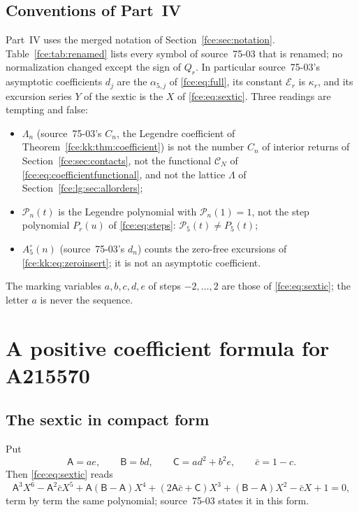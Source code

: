 \documentclass[11pt,a4paper]{article}
\numberwithin{equation}{section}
\theoremstyle{definition}\newtheorem{definition}[theorem]{Definition}
\theoremstyle{remark}\newtheorem{remark}[theorem]{Remark}
\begin{document}
\subsection{Conventions of Part~IV}\label{fce:kk:sec:conventions}
Part~IV uses the merged notation of Section~\ref{fce:sec:notation}.
Table~\ref{fce:tab:renamed} lists every symbol of source~75-03 that is
renamed; no normalization changed except the sign of $Q_r$. In particular
source~75-03's asymptotic coefficients $d_j$ are the $\alpha_{5,j}$ of
\eqref{fce:eq:full}, its constant $\mathcal E_r$ is $\kappa_r$, and its
excursion series $Y$ of the sextic is the $X$ of \eqref{fce:eq:sextic}.
Three readings are tempting and false:
\begin{itemize}
\item $\Lambda_n$ (source~75-03's $C_n$, the Legendre coefficient of
Theorem~\ref{fce:kk:thm:coefficient}) is not the number $C_n$ of interior
returns of Section~\ref{fce:sec:contacts}, not the functional
$\mathcal C_N$ of \eqref{fce:eq:coefficientfunctional}, and not the
lattice $\Lambda$ of Section~\ref{fce:lg:sec:allorders};
\item $\mathcal P_n(t)$ is the Legendre polynomial with
$\mathcal P_n(1)=1$, not the step polynomial $P_r(u)$ of
\eqref{fce:eq:steps}: $\mathcal P_5(t)\ne P_5(t)$;
\item $A^\circ_5(n)$ (source~75-03's $d_n$) counts the zero-free
excursions of \eqref{fce:kk:eq:zeroinsert}; it is not an asymptotic
coefficient.
\end{itemize}
The marking variables $a,b,c,d,e$ of steps $-2,\ldots,2$ are those of
\eqref{fce:eq:sextic}; the letter $a$ is never the sequence.

\section{A positive coefficient formula for A215570}\label{fce:kk:sec:formula}
\subsection{The sextic in compact form}\label{fce:kk:sec:sextic}
Put
\[
 \mathsf A=ae,\qquad \mathsf B=bd,\qquad \mathsf C=ad^2+b^2e,\qquad
 \bar c=1-c .
\]
Then \eqref{fce:eq:sextic} reads
\begin{equation}\label{fce:kk:eq:sextic}
 \mathsf A^3X^6-\mathsf A^2\bar cX^5+\mathsf A(\mathsf B-\mathsf A)X^4
 +(2\mathsf A\bar c+\mathsf C)X^3+(\mathsf B-\mathsf A)X^2-\bar cX+1=0,
\end{equation}
term by term the same polynomial; source~75-03 states it in this form.
\end{document}
